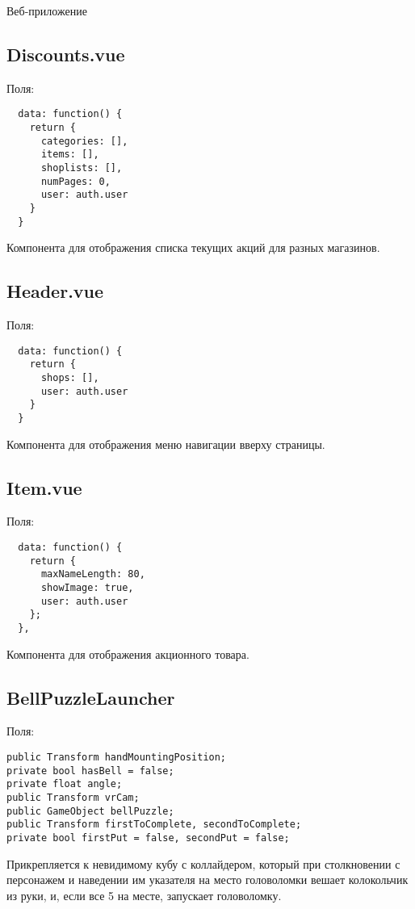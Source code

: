 
Веб-приложение
\subsection{Discounts.vue}
Поля:\\
\begin{verbatim}
  data: function() {
    return {
      categories: [],
      items: [],
      shoplists: [],
      numPages: 0,
      user: auth.user
    }
  }
\end{verbatim}
Компонента для отображения списка текущих акций для разных магазинов.

\subsection{Header.vue}
Поля:\\
\begin{verbatim}
  data: function() {
    return {
      shops: [],
      user: auth.user
    }
  }
\end{verbatim}
Компонента для отображения меню навигации вверху страницы.

\subsection{Item.vue}
Поля:\\
\begin{verbatim}
  data: function() {
    return {
      maxNameLength: 80,
      showImage: true,
      user: auth.user
    };
  },
\end{verbatim}
Компонента для отображения акционного товара.


\subsection{BellPuzzleLauncher}
Поля:\\
\begin{small}
    \begin{verbatim}
public Transform handMountingPosition;
private bool hasBell = false;
private float angle;
public Transform vrCam;
public GameObject bellPuzzle;
public Transform firstToComplete, secondToComplete;
private bool firstPut = false, secondPut = false;
    \end{verbatim}
\end{small}
Прикрепляется к невидимому кубу с коллайдером, который при столкновении с персонажем и наведении им указателя на место головоломки вешает колокольчик из руки, и, если все 5 на месте, запускает головоломку. 

